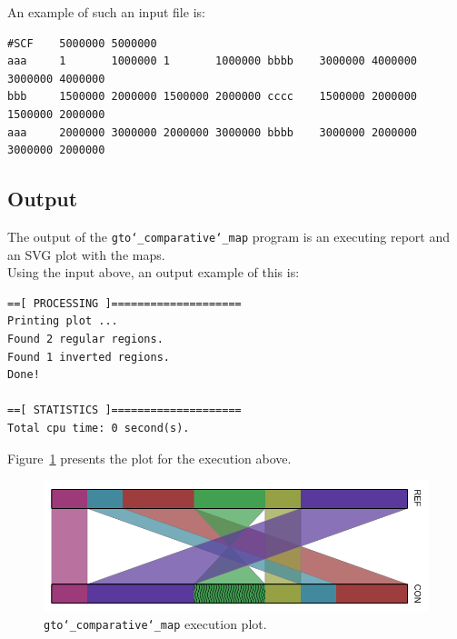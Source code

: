 An example of such an input file is:
\begin{lstlisting}
#SCF    5000000 5000000
aaa     1       1000000 1       1000000 bbbb    3000000 4000000 3000000 4000000
bbb     1500000 2000000 1500000 2000000 cccc    1500000 2000000 1500000 2000000
aaa     2000000 3000000 2000000 3000000 bbbb    3000000 2000000 3000000 2000000
\end{lstlisting}

\subsection*{Output}
The output of the \texttt{gto\char`_comparative\char`_map} program is an executing report and an SVG plot with the maps.\\
Using the input above, an output example of this is:
\begin{lstlisting}
==[ PROCESSING ]====================
Printing plot ...
Found 2 regular regions. 
Found 1 inverted regions.
Done!                       

==[ STATISTICS ]====================
Total cpu time: 0 second(s).
\end{lstlisting}

Figure~\ref{fig:gtoComparativeMap} presents the plot for the execution above.

 \begin{figure}[!h]
  \centering
  \includegraphics[scale=0.6]{./images/gto_comparative_map.png}
  \caption{\texttt{gto\char`_comparative\char`_map} execution plot.}
  \label{fig:gtoComparativeMap}
 \end{figure}